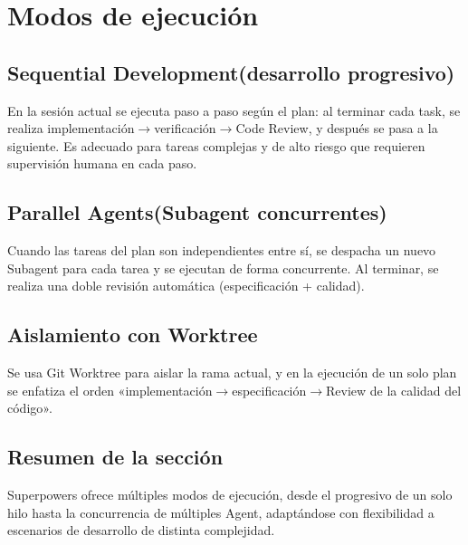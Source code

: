 \section{Modos de ejecución}

\subsection{Sequential Development(desarrollo progresivo)}

En la sesión actual se ejecuta paso a paso según el plan: al terminar cada task, se realiza implementación$\rightarrow$verificación$\rightarrow$Code Review, y después se pasa a la siguiente. Es adecuado para tareas complejas y de alto riesgo que requieren supervisión humana en cada paso.

\subsection{Parallel Agents(Subagent concurrentes)}

Cuando las tareas del plan son independientes entre sí, se despacha un nuevo Subagent para cada tarea y se ejecutan de forma concurrente. Al terminar, se realiza una doble revisión automática (especificación + calidad).

\subsection{Aislamiento con Worktree}

Se usa Git Worktree para aislar la rama actual, y en la ejecución de un solo plan se enfatiza el orden «implementación$\rightarrow$especificación$\rightarrow$Review de la calidad del código».

\subsection{Resumen de la sección}

Superpowers ofrece múltiples modos de ejecución, desde el progresivo de un solo hilo hasta la concurrencia de múltiples Agent, adaptándose con flexibilidad a escenarios de desarrollo de distinta complejidad.


